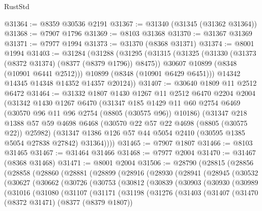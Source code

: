 \begin{lexlean}{RustStd}
\begin{coremodule}
@31364 := @8359 @30536 @2191
@31367 := @31340 (@31345 (@31362 @31364))
@31368 := @7907 @1796
@31369 := @8103 @31368
@31370 := @31367 @31369
@31371 := @7977 @1994
@31373 := @31370 (@8368 @31371)
@31374 := @8001 @1994
@31403 := @31284
    (@31288
      (@31295
        (@31315
          (@31325
            (@31330 (@31373 (@8372 @31374) (@8377 (@8379 @1796)) @8475))
            @30607
            @10899
            (@8348 (@10901 @6441 @2512)))
          @10899
          (@8348 (@10901 @6429 @6451)))
        @14342
        @14345
        @14348
        @14352
        @14357
        @20124))
@31407 := @30640 @1809 @11 @2512 @6472
@31464 := @31332
    @1807
    @1430
    @1267
    @11
    @2512
    @6470
    @2204
    @2004
    (@31342
      @1430
      @1267
      @6470
      (@31347
        @185
        @1429
        @11
        @60
        @2754
        @6469
        (@30570 @96 @11 @96 @2754 (@8805 (@30575 @96)) @10186)
        (@31347
          @218
          @1388
          @57
          @59
          @4698
          @6468
          (@30570 @22 @57 @22 @4698 (@8805 (@30575 @22)) @25982)
          (@31347 @1386 @126 @57 @44 @5054 @2410 (@30595 @1385 @5054 @27838 @27842) @31364))))
@31465 := @7907 @1807
@31466 := @8103 @31465
@31467 := @31464 @31466
@31468 := @7977 @2004
@31470 := @31467 (@8368 @31468)
@31471 := @8001 @2004
@31506 := @28790
    (@28815
      (@28856
        (@28858
          (@28860
            (@28881
              (@28899
                (@28916
                  (@28930
                    (@28941
                      (@28945
                        (@30532
                          (@30627
                            (@30662
                              (@30726
                                (@30753
                                  (@30812
                                    (@30839
                                      (@30903
                                        (@30930
                                          (@30989
                                            (@31016
                                              (@31080
                                                (@31107
                                                  (@31171
                                                    (@31198
                                                      (@31276
                                                        (@31403
                                                          (@31407
                                                            (@31470
                                                              (@8372 @31471)
                                                              (@8377 (@8379 @1807))

\end{coremodule}
\end{lexlean}
